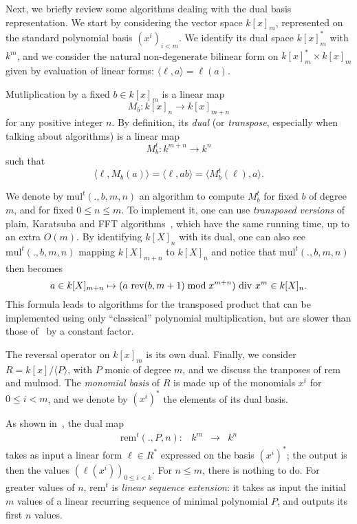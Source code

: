 \documentclass[12pt]{article}
\def\mul {\ensuremath{\mathrm{mul}}}
\def\rem {\ensuremath{\mathrm{rem}}}
\def\mulmod {\ensuremath{\mathrm{mulmod}}}
\def\rev {\ensuremath{\mathrm{rev}}}
\newcommand{\bk}[2]{\langle#1,#2\rangle}
\begin{document}
Next, we briefly review some algorithms dealing with the dual basis
representation.  We start by considering the vector space $k[x]_m$,
represented on the standard polynomial basis $(x^i)_{i<m}$. We
identify its dual space $k[x]_m^\ast$ with $k^m$, and we consider the
natural non-degenerate bilinear form on $k[x]_m^\ast\times k[x]_m$
given by evaluation of linear forms: $\bk{\ell}{a} = \ell(a)$.

Mutliplication by a fixed $b\in k[x]_m$ is a linear map
\begin{equation*}
  M_b: k[x]_n \to k[x]_{m+n}
\end{equation*}
for any positive integer $n$. By definition, its \emph{dual} (or
\emph{transpose}, especially when talking about algorithms) is a
linear map
\begin{equation*}
  M_b^t : k^{m+n} \to k^n
\end{equation*}
such that
\begin{equation*}
  \bk{\ell}{M_b(a)} = \bk{\ell}{ab} = \bk{M_b^t(\ell)}{a}.
\end{equation*}

We denote by $\mul^t(.,b,m,n)$ an algorithm to compute $M_b^t$ for
fixed $b$ of degree $m$, and for fixed $0\le n\le m$. To implement it,
one can use \emph{transposed versions} of plain, Karatsuba and FFT
algorithms~\cite{bostan+lecerf+schost:tellegen,hanrot+quercia+zimmermann},
which have the same running time, up to an extra $O(m)$.  By
identifying $k[X]_n$ with its dual, one can also see $\mul^t(.,b,m,n)$
mapping $k[X]_{m+n}$ to $k[X]_{n}$ and notice that $\mul^t(.,b,m,n)$
then becomes $$a \in k[X]_{m+n} \mapsto (a\ \rev(b,m+1) \bmod
x^{m+n}){\rm~div~}x^{m} \in k[X]_n.$$ This formula leads to algorithms
for the transposed product that can be implemented using only
``classical'' polynomial multiplication, but are slower than those
of~\cite{bostan+lecerf+schost:tellegen,hanrot+quercia+zimmermann} by a
constant factor.

The reversal operator on $k[x]_m$ is its own dual. Finally, we
consider $R=k[x]/\langle P\rangle$, with $P$ monic of degree $m$, and
we discuss the tranposes of $\rem$ and $\mulmod$.  The \emph{monomial
  basis} of $R$ is made up of the monomials $x^i$ for $0\le i<m$, and
we denote by $(x^i)^\ast$ the elements of its dual basis.

As shown in~\cite{bostan+lecerf+schost:tellegen}, the dual map
$$
\begin{array}{cccc}
\rem^t(.,P,n): &k^m& \to &k^n
\end{array}$$ 
takes as input a linear form $\ell\in R^\ast$ expressed on the basis $(x^i)^\ast$; the output
is then the values $(\ell(x^i))_{0 \le i < k}$. For $n \le m$, there
is nothing to do. For greater values of $n$, $\rem^t$ is \emph{linear sequence extension}: it takes as input the initial $m$ values of a linear recurring sequence of minimal polynomial $P$, and outputs its first $n$ values.
\end{document}
